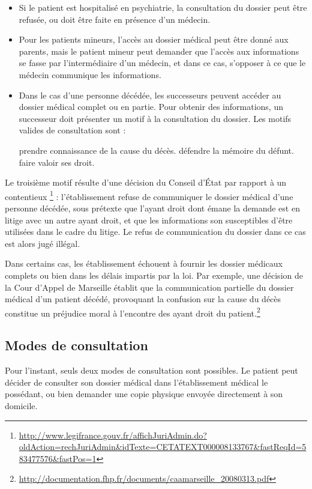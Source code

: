 \begin{itemize}

    \item Si le patient est hospitalisé en psychiatrie, la consultation du dossier peut être
refusée, ou doit être faite en présence d'un médecin.

\item Pour les patients mineurs, l'accès au dossier médical peut être donné aux parents,
mais le patient mineur peut demander que l'accès aux informations se fasse par
l'intermédiaire d'un médecin, et dans ce cas, s'opposer à ce que le médecin communique les informations.

\item Dans le cas d'une personne décédée, les successeurs peuvent accéder au dossier médical complet
    ou en partie. Pour obtenir des informations, un successeur doit présenter un motif
à la consultation du dossier. Les motifs valides de consultation sont :

    \subitem prendre connaissance de la cause du décès.
    \subitem défendre la mémoire du défunt.
    \subitem faire valoir ses droit.

\end{itemize}

Le troisième motif résulte d'une décision du Conseil d'État par rapport à un contentieux
\footnote{\url{http://www.legifrance.gouv.fr/affichJuriAdmin.do?oldAction=rechJuriAdmin&idTexte=CETATEXT000008133767&fastReqId=583477576&fastPos=1}} : l'établissement refuse de communiquer le dossier médical d'une
personne décédée, sous prétexte que l'ayant droit dont émane la demande est en litige avec un autre
ayant droit, et que les informations son susceptibles d'être utilisées dans le cadre du litige.
Le refus de communication du dossier dans ce cas est alors jugé illégal.

Dans certains cas, les établissement échouent à fournir les dossier médicaux complets ou bien dans les
délais impartis par la loi. Par exemple, une décision de la Cour d'Appel de Marseille établit que
la communication partielle du dossier médical d'un patient décédé, provoquant la confusion sur
la cause du décès constitue un préjudice moral à l'encontre des ayant droit
du patient.\footnote{\url{http://documentation.fhp.fr/documents/caamarseille_20080313.pdf}}


\subsection{Modes de consultation}

Pour l'instant, seuls deux modes de consultation sont possibles. Le patient peut décider de
consulter son dossier médical dans l'établissement médical le possédant, ou bien demander 
une copie physique envoyée directement à son domicile.


